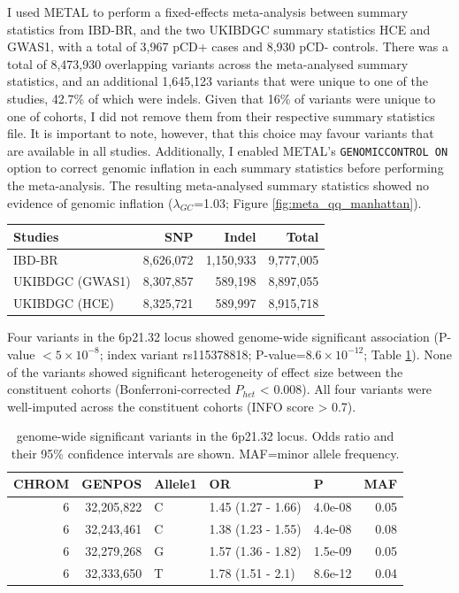 I used METAL to perform a fixed-effects meta-analysis between summary statistics from IBD-BR, and the two UKIBDGC summary statistics HCE and GWAS1, with a total of 3,967 pCD+ cases and 8,930 pCD- controls. There was a total of 8,473,930 overlapping variants across the meta-analysed summary statistics, and an additional 1,645,123 variants that were unique to one of the studies, 42.7\% of which were indels. Given that 16\% of variants were unique to one of cohorts, I did not remove them from their respective summary statistics file. It is important to note, however, that this choice may favour variants that are available in all studies. Additionally, I enabled METAL's \Verb+GENOMICCONTROL ON+ option to correct genomic inflation in each summary statistics before performing the meta-analysis. The resulting meta-analysed summary statistics showed no evidence of genomic inflation ($\lambda_{GC}$=1.03; Figure \ref{fig:meta_qq_manhattan}). 
\begin{table}[H]
  \centering
  \begin{tabular}[t]{lrrr}
  \toprule
  \textbf{Studies} & \textbf{SNP} & \textbf{Indel} & \textbf{Total}\\
  \midrule
  IBD-BR & 8,626,072 & 1,150,933 & 9,777,005\\
  UKIBDGC (GWAS1) & 8,307,857 & 589,198 & 8,897,055\\
  UKIBDGC (HCE) & 8,325,721 & 589,997 & 8,915,718\\
  \bottomrule
  \end{tabular}
  \end{table}
  Four variants in the 6p21.32 locus showed genome-wide significant association (P-value $< 5\times10^{-8}$; index variant rs115378818; P-value=$8.6\times10^{-12}$; Table \ref{table:gws}). None of the variants showed significant heterogeneity of effect size between the constituent cohorts (Bonferroni-corrected $P_{het}$ < 0.008). All four variants were well-imputed across the constituent cohorts (INFO score > 0.7).
  \begin{table}[H]
    \caption{genome-wide significant variants in the 6p21.32 locus. Odds ratio and their 95\% confidence intervals are shown. MAF=minor allele frequency.}
    \label{table:gws}
    \centering\begingroup\fontsize{10}{12}\selectfont
    
    \begin{tabular}[t]{|r|r|l|l|l|r|}
    \hline
    CHROM & GENPOS & Allele1 & OR & P & MAF\\
    \hline
    6 & 32,205,822 & C & 1.45 (1.27 - 1.66) & 4.0e-08 & 0.05\\
    \hline
    6 & 32,243,461 & C & 1.38 (1.23 - 1.55) & 4.4e-08 & 0.08\\
    \hline
    6 & 32,279,268 & G & 1.57 (1.36 - 1.82) & 1.5e-09 & 0.05\\
    \hline
    6 & 32,333,650 & T & 1.78 (1.51 - 2.1) & 8.6e-12 & 0.04\\
    \hline
    \end{tabular}
    \endgroup{}
    \end{table}
